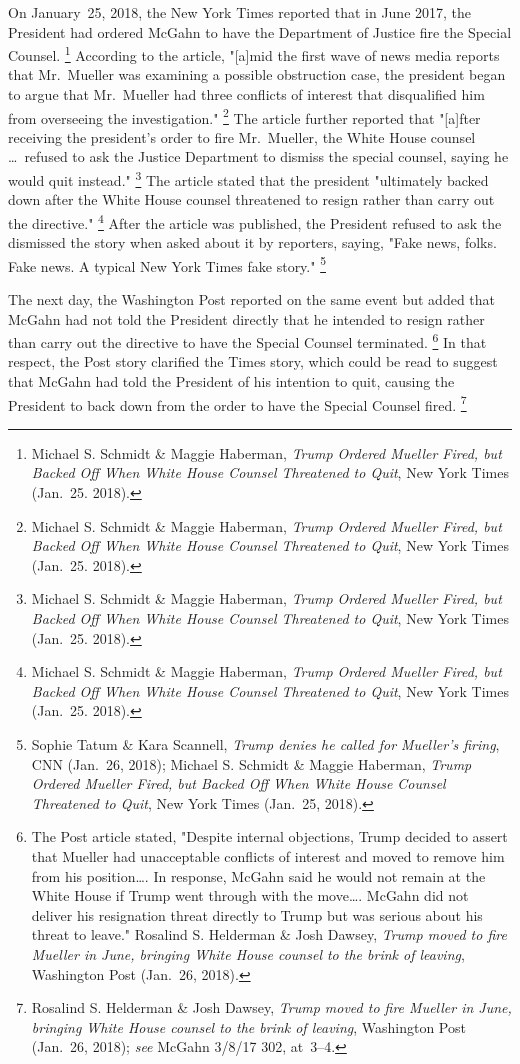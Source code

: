 On January~25, 2018, the New York Times reported that in June 2017, the President had ordered McGahn to have the Department of Justice fire the Special Counsel.%
\footnote{Michael S. Schmidt \& Maggie Haberman, \textit{Trump Ordered Mueller Fired, but Backed Off When White House Counsel Threatened to Quit}, New York Times (Jan.~25. 2018).}
According to the article, "[a]mid the first wave of news media reports that Mr.~Mueller was examining a possible obstruction case, the president began to argue that Mr.~Mueller had three conflicts of interest that disqualified him from overseeing the investigation."%
\footnote{Michael S. Schmidt \& Maggie Haberman, \textit{Trump Ordered Mueller Fired, but Backed Off When White House Counsel Threatened to Quit}, New York Times (Jan.~25. 2018).}
The article further reported that "[a]fter receiving the president's order to fire Mr.~Mueller, the White House counsel \dots\ refused to ask the Justice Department to dismiss the special counsel, saying he would quit instead."%
\footnote{Michael S. Schmidt \& Maggie Haberman, \textit{Trump Ordered Mueller Fired, but Backed Off When White House Counsel Threatened to Quit}, New York Times (Jan.~25. 2018).}
The article stated that the president "ultimately backed down after the White House counsel threatened to resign rather than carry out the directive."%
\footnote{Michael S. Schmidt \& Maggie Haberman, \textit{Trump Ordered Mueller Fired, but Backed Off When White House Counsel Threatened to Quit}, New York Times (Jan.~25. 2018).}
After the article was published, the President
refused to ask the
dismissed the story when asked about it by reporters, saying, "Fake news, folks.
Fake news.
A typical New York Times fake story."%
\footnote{Sophie Tatum \& Kara Scannell, \textit{Trump denies he called for Mueller's firing}, CNN (Jan.~26, 2018);
Michael S. Schmidt \& Maggie Haberman, \textit{Trump Ordered Mueller Fired, but Backed Off When White House Counsel Threatened to Quit}, New York Times (Jan.~25, 2018).}

The next day, the Washington Post reported on the same event but added that McGahn had not told the President directly that he intended to resign rather than carry out the directive to have the Special Counsel terminated.%
\footnote{The Post article stated, "Despite internal objections, Trump decided to assert that Mueller had unacceptable conflicts of interest and moved to remove him from his position\dots.
In response, McGahn said he would not remain at the White House if Trump went through with the move\dots.
McGahn did not deliver his resignation threat directly to Trump but was serious about his threat to leave."
Rosalind S. Helderman \& Josh Dawsey, \textit{Trump moved to fire Mueller in June, bringing White House counsel to the brink of leaving}, Washington Post (Jan.~26, 2018).}
In that respect, the Post story clarified the Times story, which could be read to suggest that McGahn had told the President of his intention to quit, causing the President to back down from the order to have the Special Counsel fired.%
\footnote{Rosalind S. Helderman \& Josh Dawsey, \textit{Trump moved to fire Mueller in June, bringing White House counsel to the brink of leaving}, Washington Post (Jan.~26, 2018);
\textit{see} McGahn 3/8/17 302, at~3--4.}

